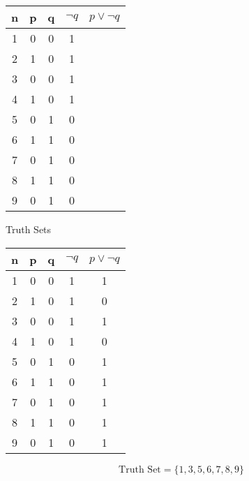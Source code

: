 \begin{center}
\begin{tabular}{|c||c|c||c||c|}
\hline \phantom{sp} n \phantom{sp} & \phantom{sp} p \phantom{sp} & \phantom{sp}q \phantom{sp}& \phantom{s} $\neg q$ \phantom{s}& \phantom{s} $p \vee \neg q$ \phantom{s}\\  \hline
\hline 1 & 0 & 0 & 1 & \\ 
\hline 2 & 1 & 0 & 1 & \\ 
\hline 3 & 0 & 0 & 1 & \\ 
\hline 4 & 1 & 0 & 1 & \\ 
\hline 5 & 0 & 1 & 0 & \\ 
\hline 6 & 1 & 1 & 0 & \\ 
\hline 7 & 0 & 1 & 0 & \\ 
\hline 8 & 1 & 1 & 0 & \\ 
\hline 9 & 0 & 1 & 0 & \\ 
\hline 
\end{tabular}
\end{center} 


{Truth Sets}

\begin{center}
\begin{tabular}{|c||c|c||c||c|}
\hline \phantom{sp} n \phantom{sp} & \phantom{sp} p \phantom{sp} & \phantom{sp}q \phantom{sp}& \phantom{s} $\neg q$ \phantom{s}& \phantom{s} $p \vee \neg q$ \phantom{s}\\  \hline
\hline 1 & 0 & 0 & 1 & 1\\ 
\hline 2 & 1 & 0 & 1 & 0\\ 
\hline 3 & 0 & 0 & 1 & 1\\ 
\hline 4 & 1 & 0 & 1 & 0\\ 
\hline 5 & 0 & 1 & 0 & 1\\ 
\hline 6 & 1 & 1 & 0 & 1\\ 
\hline 7 & 0 & 1 & 0 & 1\\ 
\hline 8 & 1 & 1 & 0 & 1\\ 
\hline 9 & 0 & 1 & 0 & 1\\ 
\hline 
\end{tabular}
\end{center} 
\[\mbox{Truth Set} = \{1,3,5,6,7,8,9\}\]


